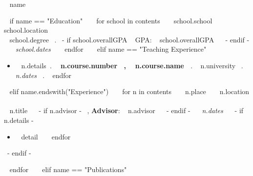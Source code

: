 \medskip

\begin{minipage}{\textwidth}
{\huge ~{{ name }}~ }

~{ if name == "Education" }~
  ~{ for school in contents }~
    {\large ~{{ school.school }}~ } \hfill ~{{ school.location }}~ \\
    ~{{ school.degree }}~.
    ~{- if school.overallGPA }~
      GPA: ~{{ school.overallGPA }}~
    ~{- endif -}~
    \hfill {\it ~{{ school.dates }}~}
    \bigskip
  ~{ endfor }~
~{ elif name == "Teaching Experience" }~
  \begin{itemize}
    ~{ for n in contents }~
      \item
        ~{{ n.details}}~.
        {\bf ~{{ n.course.number }}~, ~{{ n.course.name }}~}.
        ~{{ n.university }}~.
        {\it ~{{ n.dates }}~}.
    ~{ endfor }~
  \end{itemize}
~{ elif name.endswith("Experience") }~
  ~{ for n in contents }~
    {\large ~{{ n.place }}~ } \hfill ~{{ n.location }}~ \\
    ~{{ n.title }}~
    ~{- if n.advisor -}~
      , {\bf Advisor}: ~{{ n.advisor }}~
    ~{- endif -}~
    \hfill {\it ~{{ n.dates }}~}
    ~{- if n.details -}~
      \begin{itemize}
      ~{ for detail in n.details }~
        \item ~{{ detail }}~
      ~{ endfor }~
      \end{itemize}
    ~{- endif -}~
    \end{minipage}
    \begin{minipage}{\textwidth}
    \bigskip
  ~{ endfor }~
~{ elif name == "Publications" }~
  \nocite{*}
  \printbibliography[heading=none,type=inproceedings]
  \end{minipage}
